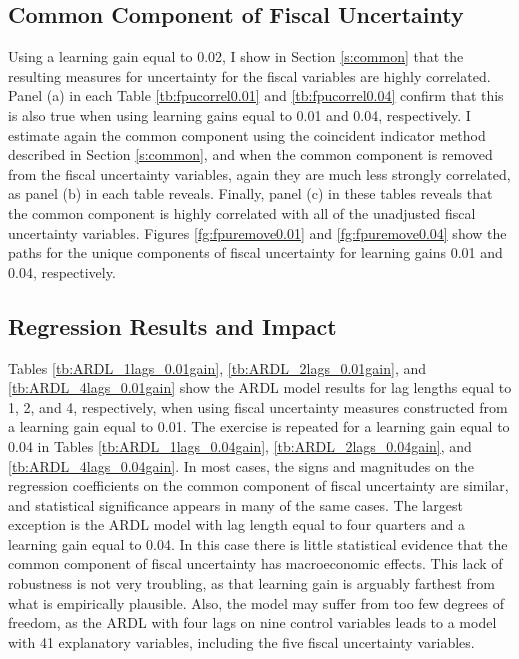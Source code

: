 \documentclass[11pt]{article}
\begin{document}
\subsection{Common Component of Fiscal Uncertainty}

Using a learning gain equal to 0.02, I show in Section \ref{s:common} that the resulting measures for uncertainty for the fiscal variables are highly correlated.  Panel (a) in each Table \ref{tb:fpucorrel0.01} and \ref{tb:fpucorrel0.04} confirm that this is also true when using learning gains equal to 0.01 and 0.04, respectively.  I estimate again the common component using the coincident indicator method described in Section \ref{s:common}, and when the common component is removed from the fiscal uncertainty variables, again they are much less strongly correlated, as panel (b) in each table reveals.  Finally, panel (c) in these tables reveals that the common component is highly correlated with all of the unadjusted fiscal uncertainty variables.  Figures \ref{fg:fpuremove0.01} and \ref{fg:fpuremove0.04} show the paths for the unique components of fiscal uncertainty for learning gains 0.01 and 0.04, respectively.

\subsection{Regression Results and Impact}
Tables \ref{tb:ARDL_1lags_0.01gain}, \ref{tb:ARDL_2lags_0.01gain}, and \ref{tb:ARDL_4lags_0.01gain} show the ARDL model results for lag lengths equal to 1, 2, and 4, respectively, when using fiscal uncertainty measures constructed from a learning gain equal to 0.01.  The exercise is repeated for a learning gain equal to 0.04 in Tables \ref{tb:ARDL_1lags_0.04gain}, \ref{tb:ARDL_2lags_0.04gain}, and \ref{tb:ARDL_4lags_0.04gain}.  In most cases, the signs and magnitudes on the regression coefficients on the common component of fiscal uncertainty are similar, and statistical significance appears in many of the same cases.  The largest exception is the ARDL model with lag length equal to four quarters and a learning gain equal to 0.04.  In this case there is little statistical evidence that the common component of fiscal uncertainty has macroeconomic effects.  This lack of robustness is not very troubling, as that learning gain is arguably farthest from what is empirically plausible.  Also, the model may suffer from too few degrees of freedom, as the ARDL with four lags on nine control variables leads to a model with 41 explanatory variables, including the five fiscal uncertainty variables.
\end{document}
